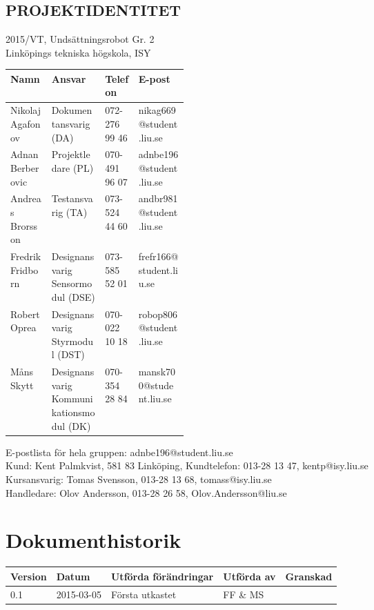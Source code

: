 \documentclass[11pt]{article}
\begin{document}
	\setcounter{secnumdepth}{0} %
	\pagebreak
\begin{center}

\section*{PROJEKTIDENTITET}
\label{sec:projektindentitet}
2015/VT, Undsättningsrobot Gr. 2
\\
Linköpings tekniska högskola, ISY
\\[0.5in]
\begin{table}[h]
\begin{tabular}{|l|p{0.3\linewidth}|l|l|} \hline
Namn & Ansvar & Telefon & E-post \\[0.1in] \hline
Nikolaj Agafonov & Dokumentansvarig (DA) & 072-276 99 46 & nikag669@student.liu.se \\ \hline
Adnan Berberovic & Projektledare (PL) & 070-491 96 07 & adnbe196@student.liu.se \\ \hline
Andreas Brorsson & Testansvarig (TA) & 073-524 44 60 & andbr981@student.liu.se \\ \hline
Fredrik Fridborn & Designansvarig Sensormodul (DSE) & 073-585 52 01 & frefr166@student.liu.se \\ \hline
Robert Oprea & Designansvarig Styrmodul (DST) & 070-022 10 18 & robop806@student.liu.se \\ \hline
Måns Skytt & Designansvarig Kommunikationsmodul (DK) & 070-354 28 84 & mansk700@student.liu.se \\ \hline

\end{tabular}
\end{table}

E-postlista för hela gruppen: adnbe196@student.liu.se
\\[1in]
Kund: Kent Palmkvist, 581 83 Linköping,
Kundtelefon: 013-28 13 47, kentp@isy.liu.se
\\[1in]
Kursansvarig: Tomas Svensson, 013-28 13 68, tomass@isy.liu.se
\\
Handledare: Olov Andersson, 013-28 26 58, Olov.Andersson@liu.se
\end{center}
\pagebreak

\section*{Dokumenthistorik}
\begin{table}[h]
\begin{tabular}{|l|l|l|l|l|} \hline

Version & 
Datum & 
Utförda förändringar & 
Utförda av & 
Granskad \\[0.1in] \hline

0.1 &
2015-03-05 & 
Första utkastet & 
FF \& MS & 
\\ \hline
\end{tabular}
\end{table}
\end{document}
